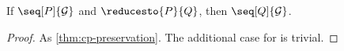 \begin{theorem}[Preservation]\label{thm:hcp-preservation}
  If $\seq[P]{\mathcal{G}}$ and $\reducesto{P}{Q}$, then $\seq[Q]{\mathcal{G}}$.
\end{theorem}
\begin{proof}
  As \cref{thm:cp-preservation}.
  The additional case for \hcpRedGammaMix is trivial.
\end{proof}
